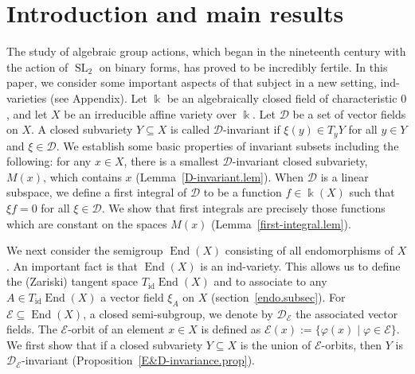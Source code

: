 \documentclass{amsart}
\theoremstyle{definition}
\theoremstyle{remark}
\begin{document}
\maketitle

\section{Introduction and main results}
The study of algebraic group actions, which began in the nineteenth
century with the action of $\operatorname{SL}_{2}$ on binary forms, has proved to be
incredibly fertile. In this
paper, we consider some important aspects of that subject in a new setting,
ind-varieties (see Appendix). Let ${\Bbbk}$ be an algebraically closed field
of characteristic $0$, and let $X$ be an irreducible affine variety over ${\Bbbk}$. Let
${\mathcal D}$ be a set of vector fields on $X$. A closed subvariety
$Y\subseteq X$ is called ${\mathcal D}$-invariant if $\xi(y)\in T_{y}Y$ for all
$y\in Y$ and $\xi\in{\mathcal D}$. We establish some basic properties of
invariant subsets including the following: for any $x\in X$, there is a smallest
${\mathcal D}$-invariant closed subvariety, $M(x)$, which contains $x$ (Lemma~\ref{D-invariant.lem}). 
When ${\mathcal D}$ is a linear subspace, we define a first integral of
${\mathcal D}$ to be a function $f\in {\Bbbk}(X)$ such that $\xi f=0$ for
all $\xi\in{\mathcal D}$. We show that first integrals are precisely those
functions which are constant on the spaces $M(x)$ (Lemma~\ref{first-integral.lem}).

We next consider the semigroup $\operatorname{End}(X)$ consisting of all endomorphisms of $X
$. An important fact is that $\operatorname{End}(X)$ is an ind-variety. This allows us to define the (Zariski) tangent space
$T_\operatorname{id}\operatorname{End}(X)$ and to  associate to any $A\in T_\operatorname{id}\operatorname{End}(X)$ a vector field $\xi_{A}$ on $X$ (section~\ref{endo.subsec}). 
For ${\mathcal E}{\subseteq} \operatorname{End}(X)$, a closed semi-subgroup, we denote by ${\mathcal D}_{\mathcal E}$
the associated vector fields. The ${\mathcal E}$-orbit of an element $x\in X$ is defined as ${\mathcal E}(x):=\{{\varphi}(x)\mid {\varphi}\in {\mathcal E}\}$. We first show that if a closed subvariety $Y{\subseteq} X$ is the union of ${\mathcal E}$-orbits, then $Y$ is ${\mathcal D}_{\mathcal E}$-invariant (Proposition~\ref{E&D-invariance.prop}).
\end{document}
